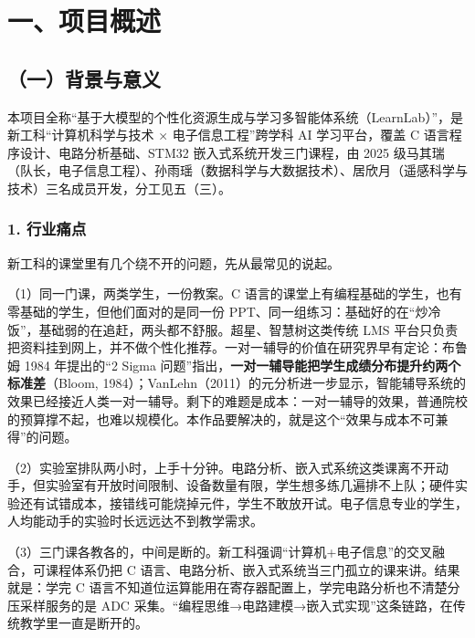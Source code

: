 \documentclass[zihao=-4,a4paper,UTF8,fontset=windows]{ctexart}
\begin{document}
\newpage
\section{一、项目概述}
\subsection{（一）背景与意义}


本项目全称“基于大模型的个性化资源生成与学习多智能体系统（LearnLab）”，是新工科“计算机科学与技术 × 电子信息工程”跨学科 AI 学习平台，覆盖 C 语言程序设计、电路分析基础、STM32 嵌入式系统开发三门课程，由 2025 级马其瑞（队长，电子信息工程）、孙雨瑶（数据科学与大数据技术）、居欣月（遥感科学与技术）三名成员开发，分工见五（三）。

\subsubsection{1. 行业痛点}


新工科的课堂里有几个绕不开的问题，先从最常见的说起。



（1）同一门课，两类学生，一份教案。C 语言的课堂上有编程基础的学生，也有零基础的学生，但他们面对的是同一份 PPT、同一组练习：基础好的在“炒冷饭”，基础弱的在追赶，两头都不舒服。超星、智慧树这类传统 LMS 平台只负责把资料挂到网上，并不做个性化推荐。一对一辅导的价值在研究界早有定论：布鲁姆 1984 年提出的“2 Sigma 问题”指出，\textbf{一对一辅导能把学生成绩分布提升约两个标准差}（Bloom, 1984）；VanLehn（2011）的元分析进一步显示，智能辅导系统的效果已经接近人类一对一辅导。剩下的难题是成本：一对一辅导的效果，普通院校的预算撑不起，也难以规模化。本作品要解决的，就是这个“效果与成本不可兼得”的问题。



（2）实验室排队两小时，上手十分钟。电路分析、嵌入式系统这类课离不开动手，但实验室有开放时间限制、设备数量有限，学生想多练几遍排不上队；硬件实验还有试错成本，接错线可能烧掉元件，学生不敢放开试。电子信息专业的学生，人均能动手的实验时长远远达不到教学需求。



（3）三门课各教各的，中间是断的。新工科强调“计算机+电子信息”的交叉融合，可课程体系仍把 C 语言、电路分析、嵌入式系统当三门孤立的课来讲。结果就是：学完 C 语言不知道位运算能用在寄存器配置上，学完电路分析也不清楚分压采样服务的是 ADC 采集。“编程思维→电路建模→嵌入式实现”这条链路，在传统教学里一直是断开的。
\end{document}

